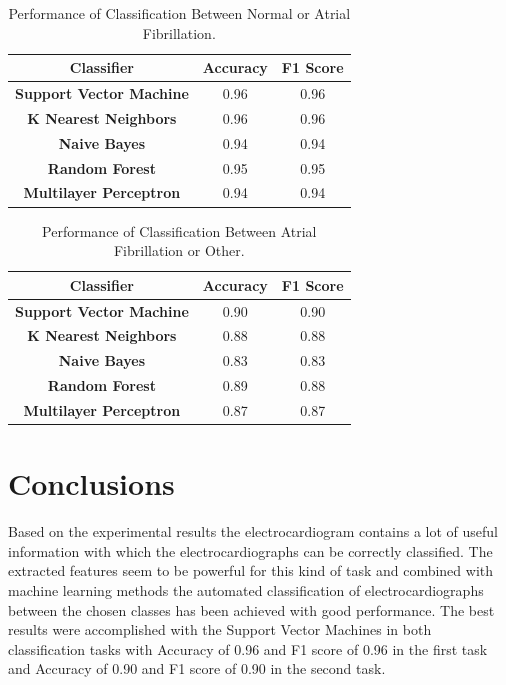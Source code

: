 \documentclass[12pt, a4paper]{article}
\begin{document}
\begin{table}[H]
	\centering
	\begin{tabular}{ | c || c || c |}
		
		\hline
		\textbf{Classifier} & \textbf{Accuracy} & \textbf{F1 Score} \\
		
		\hline
		\textbf{Support Vector Machine} & 0.96 & 0.96 \\
		
		\hline
		\textbf{K Nearest Neighbors} & 0.96 & 0.96\\  
		
		\hline
		\textbf{Naive Bayes} & 0.94 & 0.94\\  
		
		\hline
		\textbf{Random Forest} & 0.95 & 0.95\\ 
		
		\hline
		\textbf{Multilayer Perceptron} & 0.94 & 0.94\\ 
		
		\hline
	\end{tabular}
	\caption{Performance of Classification Between Normal or Atrial Fibrillation.}
	\label{tab:Normal_Atrial_St}
\end{table}

\begin{table}[H]
	\centering
	\begin{tabular}{| c || c || c |}
		\hline
		\textbf{Classifier} & \textbf{Accuracy} & \textbf{F1 Score} \\
		
		\hline
		\textbf{Support Vector Machine} & 0.90 & 0.90 \\
		
		\hline
		\textbf{K Nearest Neighbors} & 0.88 & 0.88\\  
		
		\hline
		\textbf{Naive Bayes} & 0.83 & 0.83\\  
		
		\hline
		\textbf{Random Forest} & 0.89 & 0.88\\ 
		
		\hline
		\textbf{Multilayer Perceptron} & 0.87 & 0.87\\ 
		
		\hline
	\end{tabular}
	\caption{Performance of Classification Between Atrial Fibrillation or Other.}
	\label{tab:Atrial_Other_St}
\end{table}


\section{Conclusions}
Based on the experimental results the electrocardiogram contains a lot of useful information with which the electrocardiographs can be correctly classified. The extracted features seem to be powerful for this kind of task and combined with machine learning methods the automated classification of electrocardiographs between the chosen classes has been achieved with good performance. The best results were accomplished with the Support Vector Machines in both classification tasks with Accuracy of 0.96 and F1 score of 0.96 in the first task and Accuracy of 0.90 and F1 score of 0.90 in the second task.
\end{document}

